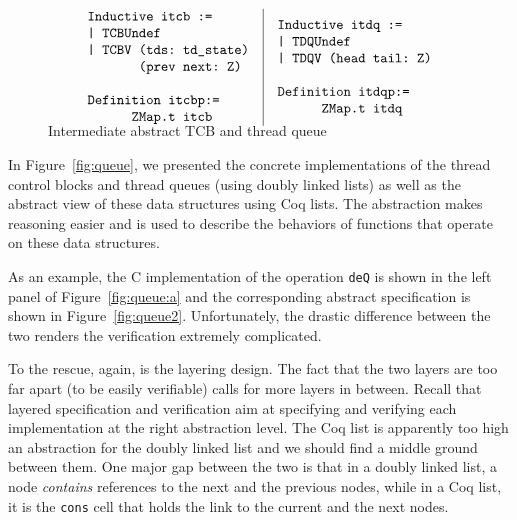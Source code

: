 {{
\setlength{\floatsep}{-10pt}
\setlength{\belowcaptionskip}{-5pt}
\begin{figure}[ht]\scriptsize
$$
\begin{array}{l|l}
\begin{array}{l}
\verb+Inductive itcb :=+\\
\verb+| TCBUndef+\\
\verb+| TCBV (tds: td_state)+\\
\verb+       (prev next: Z)+\\
\\
\verb+Definition itcbp:=+\\
\verb+      ZMap.t itcb+
\end{array}
&
\begin{array}{l}
\verb+Inductive itdq :=+\\
\verb+| TDQUndef+\\
\verb+| TDQV (head tail: Z)+\\
\\
\verb+Definition itdqp:=+\\
\verb+      ZMap.t itdq+
\end{array}
\vspace*{-14pt}
\end{array}
$$ 
\caption{Intermediate abstract TCB and thread queue}
\label{fig:abs:ltdq}
\end{figure}
}}

In Figure~\ref{fig:queue}, we
presented the concrete implementations of the thread control blocks
and thread queues (using doubly linked lists) as well as the abstract
view of these data structures using Coq lists.  The abstraction 
makes reasoning easier and is used to describe the behaviors of
functions that operate on these data structures.

As an example, the C implementation of the operation \verb"deQ" is shown
in the left panel of Figure~\ref{fig:queue:a} and the corresponding
abstract specification is shown in Figure~\ref{fig:queue2}.
Unfortunately, the drastic difference between the two renders
the verification extremely complicated.

To the rescue, again, is the layering design.  The fact that the two
layers are too far apart (to be easily verifiable) calls for more
layers in between.  Recall that layered specification and verification
aim at specifying and verifying each implementation at the right
abstraction level.  The Coq list is apparently too high an abstraction
for the doubly linked list and we should find a middle ground between
them.  One major gap between the two is that in a doubly linked list,
a node {\em contains} references to the next and the previous nodes,
while in a Coq list, it is the \verb"cons" cell that holds the link to
the current and the next nodes.

